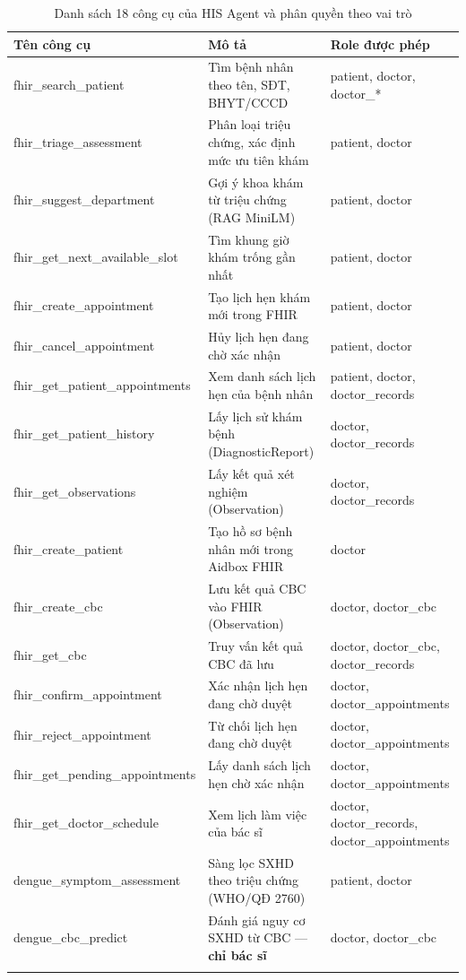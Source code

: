\documentclass[oneside, a4paper]{book}
\theoremstyle{plain}
\theoremstyle{plain}
\theoremstyle{definition}
\theoremstyle{remark}
\begin{document}
\begin{longtable}{|>{\footnotesize\ttfamily}p{4.5cm}|p{5.2cm}|p{3.7cm}|}
\hline
\normalfont\textbf{Tên công cụ} & \textbf{Mô tả} & \textbf{Role được phép} \\
\hline
fhir\_search\_patient & Tìm bệnh nhân theo tên, SĐT, BHYT/CCCD & patient, doctor, doctor\_* \\
fhir\_triage\_assessment & Phân loại triệu chứng, xác định mức ưu tiên khám & patient, doctor \\
fhir\_suggest\_department & Gợi ý khoa khám từ triệu chứng (RAG MiniLM) & patient, doctor \\
fhir\_get\_next\_available\_slot & Tìm khung giờ khám trống gần nhất & patient, doctor \\
fhir\_create\_appointment & Tạo lịch hẹn khám mới trong FHIR & patient, doctor \\
fhir\_cancel\_appointment & Hủy lịch hẹn đang chờ xác nhận & patient, doctor \\
fhir\_get\_patient\_appointments & Xem danh sách lịch hẹn của bệnh nhân & patient, doctor, doctor\_records \\
fhir\_get\_patient\_history & Lấy lịch sử khám bệnh (DiagnosticReport) & doctor, doctor\_records \\
fhir\_get\_observations & Lấy kết quả xét nghiệm (Observation) & doctor, doctor\_records \\
fhir\_create\_patient & Tạo hồ sơ bệnh nhân mới trong Aidbox FHIR & doctor \\
fhir\_create\_cbc & Lưu kết quả CBC vào FHIR (Observation) & doctor, doctor\_cbc \\
fhir\_get\_cbc & Truy vấn kết quả CBC đã lưu & doctor, doctor\_cbc, doctor\_records \\
fhir\_confirm\_appointment & Xác nhận lịch hẹn đang chờ duyệt & doctor, doctor\_appointments \\
fhir\_reject\_appointment & Từ chối lịch hẹn đang chờ duyệt & doctor, doctor\_appointments \\
fhir\_get\_pending\_appointments & Lấy danh sách lịch hẹn chờ xác nhận & doctor, doctor\_appointments \\
fhir\_get\_doctor\_schedule & Xem lịch làm việc của bác sĩ & doctor, doctor\_records, doctor\_appointments \\
dengue\_symptom\_assessment & Sàng lọc SXHD theo triệu chứng (WHO/QĐ 2760) & patient, doctor \\
dengue\_cbc\_predict & Đánh giá nguy cơ SXHD từ CBC --- \normalfont\textbf{chỉ bác sĩ} & doctor, doctor\_cbc \\
\hline
\caption{Danh sách 18 công cụ của HIS Agent và phân quyền theo vai trò}
\label{tab:fhir-tools}
\end{longtable}
\end{document}
